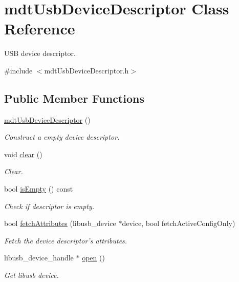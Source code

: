 \hypertarget{classmdt_usb_device_descriptor}{\section{mdt\-Usb\-Device\-Descriptor Class Reference}
\label{classmdt_usb_device_descriptor}
}


U\-S\-B device descriptor.  




{\ttfamily \#include $<$mdt\-Usb\-Device\-Descriptor.\-h$>$}

\subsection*{Public Member Functions}
\begin{DoxyCompactItemize}
\item 
\hyperlink{classmdt_usb_device_descriptor_a56261ab887b96741e5d444e92ed80b35}{mdt\-Usb\-Device\-Descriptor} ()
\begin{DoxyCompactList}\small\item\em Construct a empty device descriptor. \end{DoxyCompactList}\item 
void \hyperlink{classmdt_usb_device_descriptor_a69983cb2d99d6ba4b54c802a41804a35}{clear} ()
\begin{DoxyCompactList}\small\item\em Clear. \end{DoxyCompactList}\item 
bool \hyperlink{classmdt_usb_device_descriptor_ade0719c45c7dc6d2a67b24aa7a591e64}{is\-Empty} () const 
\begin{DoxyCompactList}\small\item\em Check if descriptor is empty. \end{DoxyCompactList}\item 
bool \hyperlink{classmdt_usb_device_descriptor_ae228620cd18a24649f02cba84a0dc1c8}{fetch\-Attributes} (libusb\-\_\-device $\ast$device, bool fetch\-Active\-Config\-Only)
\begin{DoxyCompactList}\small\item\em Fetch the device descriptor's attributes. \end{DoxyCompactList}\item 
libusb\-\_\-device\-\_\-handle $\ast$ \hyperlink{classmdt_usb_device_descriptor_a5aafc8734f4640a4c5be3bc884f5a655}{open} ()
\begin{DoxyCompactList}\small\item\em Get libusb device. \end{DoxyCompactList}\item 

\end{DoxyCompactItemize}
